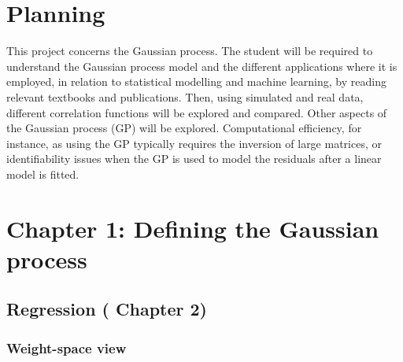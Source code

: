 \documentclass[12pt]{article}
\begin{document}
\section{Planning}
This project concerns the Gaussian process. The student will be required to understand the Gaussian process model and the different applications where it is employed, in relation to statistical modelling and machine learning, by reading relevant textbooks and publications. Then, using simulated and real data, different correlation functions will be explored and compared. Other aspects of the Gaussian process (GP) will be explored. Computational efficiency, for instance, as using the GP typically requires the inversion of large matrices, or identifiability issues when the GP is used to model the residuals after a linear model is fitted.





\section{Chapter 1: Defining the Gaussian process}




\subsection{Regression (\cite{gp-ml} Chapter 2)}



\subsubsection{Weight-space view}
\end{document}
